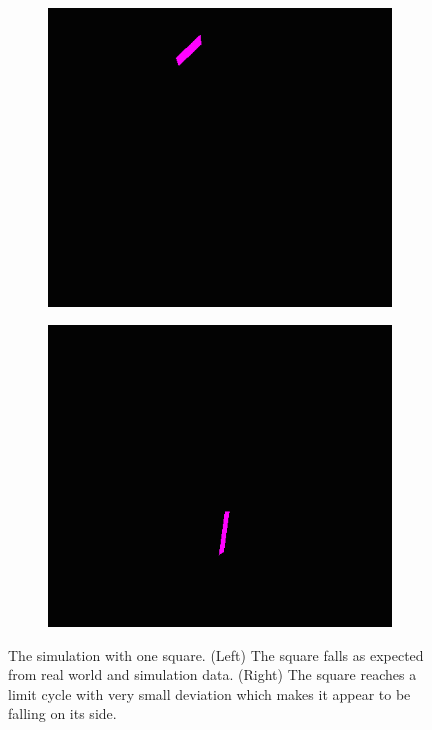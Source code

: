 \begin{figure}[H]
\centering
	\begin{subfigure}[b]{0.4\textwidth}
		\includegraphics[width=\textwidth]{Motion_Graphs/single_leaf.png}
    	\caption{\label{fig:singlefloat}}
    \end{subfigure}
    \begin{subfigure}[b]{0.395\textwidth}
		\includegraphics[width=\textwidth]{Motion_Graphs/single_equil.png}
    	\caption{\label{fig:singlefall}}
    \end{subfigure}
\caption{\label{fig:fallingleaf}The simulation with one square. (Left) The square falls as expected from real world and simulation data. (Right) The square reaches a limit cycle with very small deviation which makes it appear to be falling on its side.}
\end{figure}

